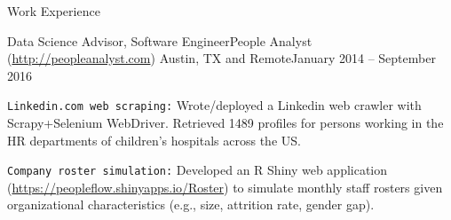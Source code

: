 \documentclass{article}
\newlength{\tabin}
\newlength{\secsep}
\newcommand{\lineunder}{\vspace*{-8pt} \\ \hspace*{-6pt} \hrulefill \\ \vspace*{-15pt}}
\newenvironment{tabbedsection}[1]{
  \begin{list}{}{
      \setlength{\itemsep}{0pt}
      \setlength{\labelsep}{0pt}
      \setlength{\labelwidth}{0pt}
      \setlength{\leftmargin}{\tabin}
      \setlength{\rightmargin}{\tabin}
      \setlength{\listparindent}{0pt}
      \setlength{\parsep}{0pt}
      \setlength{\parskip}{0pt}
      \setlength{\partopsep}{0pt}
      \setlength{\topsep}{#1}
    }
  \item[]
}{\end{list}}
\newenvironment{resume_section}[1]{
  \filbreak
  \vspace{2\secsep}
  \textsc{\large#1}
  \lineunder
  \begin{tabbedsection}{\secsep}
}{\end{tabbedsection}}
\newenvironment{subitems}{
  \renewcommand{\labelitemi}{-}
  \begin{itemize}
      \setlength{\labelsep}{1em}
}{\end{itemize}}
\newenvironment{resume_employer}[4]{
  \vspace{\secsep}
  \textbf{#1} \\ 
  \indent {\small #2} \hfill {\footnotesize#3 (#4)}
  \begin{tabbedsection}{0pt}
  \begin{subitems}
}{\end{subitems}\end{tabbedsection}}
\begin{document}
\begin{resume_section}{Work Experience}
  \begin{resume_employer}{Data Science Advisor, Software Engineer}{People Analyst (\url{http://peopleanalyst.com})}
  {Austin, TX and Remote}{January 2014 -- September 2016}
   \item \texttt{Linkedin.com web scraping:} Wrote/deployed a Linkedin web crawler with Scrapy+Selenium WebDriver. Retrieved 1489 profiles for persons working in the HR departments of children's hospitals across the US.
   \item \texttt{Company roster simulation:} Developed an R Shiny web application 
      (\url{https://peopleflow.shinyapps.io/Roster}) to simulate monthly staff rosters given organizational characteristics (e.g., size, attrition rate, gender gap).
  \end{resume_employer}


\end{resume_section}
\end{document}
